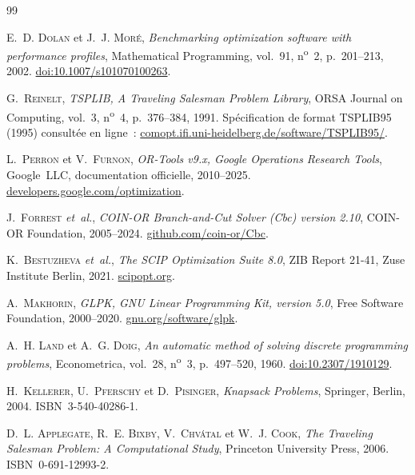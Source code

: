 \documentclass[11pt,a4paper]{article}
\begin{document}
\begin{thebibliography}{99}
\setlength{\itemsep}{0.2em}

E.~D. \textsc{Dolan} et J.~J. \textsc{Moré},
\textit{Benchmarking optimization software with performance profiles},
Mathematical Programming, vol.~91, n\textsuperscript{o}~2, p.~201--213, 2002.
\href{https://doi.org/10.1007/s101070100263}{doi:10.1007/s101070100263}.

G.~\textsc{Reinelt},
\textit{TSPLIB, A Traveling Salesman Problem Library},
ORSA Journal on Computing, vol.~3, n\textsuperscript{o}~4, p.~376--384, 1991.
Spécification de format TSPLIB95 (1995) consultée en ligne~:
\href{http://comopt.ifi.uni-heidelberg.de/software/TSPLIB95/}{comopt.ifi.uni-heidelberg.de/software/TSPLIB95/}.

L.~\textsc{Perron} et V.~\textsc{Furnon},
\textit{OR-Tools v9.x, Google Operations Research Tools},
Google~LLC, documentation officielle, 2010--2025.
\href{https://developers.google.com/optimization}{developers.google.com/optimization}.

J.~\textsc{Forrest} \textit{et~al.},
\textit{COIN-OR Branch-and-Cut Solver (Cbc) version 2.10},
COIN-OR Foundation, 2005--2024.
\href{https://github.com/coin-or/Cbc}{github.com/coin-or/Cbc}.

K.~\textsc{Bestuzheva} \textit{et~al.},
\textit{The SCIP Optimization Suite 8.0},
ZIB Report 21-41, Zuse Institute Berlin, 2021.
\href{https://www.scipopt.org/}{scipopt.org}.

A.~\textsc{Makhorin},
\textit{GLPK, GNU Linear Programming Kit, version 5.0},
Free Software Foundation, 2000--2020.
\href{https://www.gnu.org/software/glpk/}{gnu.org/software/glpk}.

A.~H. \textsc{Land} et A.~G. \textsc{Doig},
\textit{An automatic method of solving discrete programming problems},
Econometrica, vol.~28, n\textsuperscript{o}~3, p.~497--520, 1960.
\href{https://doi.org/10.2307/1910129}{doi:10.2307/1910129}.

H.~\textsc{Kellerer}, U.~\textsc{Pferschy} et D.~\textsc{Pisinger},
\textit{Knapsack Problems},
Springer, Berlin, 2004. ISBN~3-540-40286-1.

D.~L. \textsc{Applegate}, R.~E. \textsc{Bixby}, V.~\textsc{Chvátal} et W.~J. \textsc{Cook},
\textit{The Traveling Salesman Problem: A Computational Study},
Princeton University Press, 2006. ISBN~0-691-12993-2.


\end{thebibliography}
\end{document}
